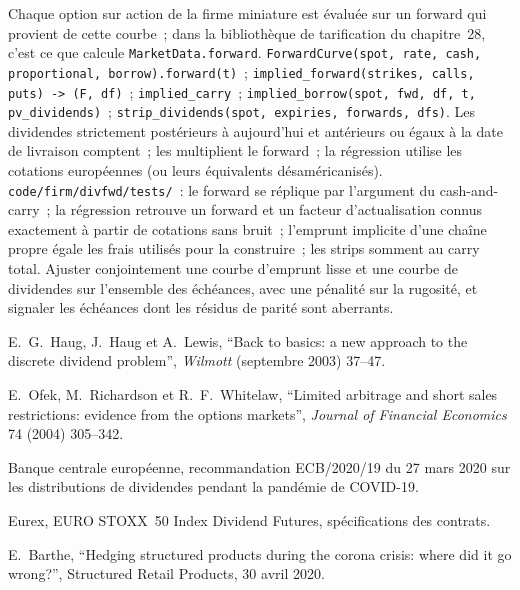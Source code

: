 \begin{build}
 Chaque option sur action de la firme miniature est évaluée sur un forward qui
provient de cette courbe~; dans la bibliothèque de tarification du chapitre~28, c'est ce que
calcule \texttt{MarketData.forward}. 
\texttt{ForwardCurve(spot, rate, cash, proportional,
borrow).forward(t)}~; \texttt{implied\_forward(strikes, calls, puts) -> (F, df)}~;
\texttt{implied\_carry}~; \texttt{implied\_borrow(spot, fwd, df, t, pv\_dividends)}~;
\texttt{strip\_dividends(spot, expiries, forwards, dfs)}.
 Les dividendes strictement postérieurs à aujourd'hui et antérieurs ou égaux à la date de livraison comptent~;
les  multiplient le forward~; la régression utilise les cotations européennes (ou
leurs équivalents désaméricanisés).
 \texttt{code/firm/divfwd/tests/}~: le forward se réplique par
l'argument du cash-and-carry~; la régression retrouve un forward et un facteur d'actualisation connus
exactement à partir de cotations sans bruit~; l'emprunt implicite d'une chaîne propre égale les frais utilisés
pour la construire~; les strips somment au carry total.
 Ajuster conjointement une courbe d'emprunt lisse et une courbe de dividendes sur l'ensemble des échéances,
avec une pénalité sur la rugosité, et signaler les échéances dont les résidus de parité sont aberrants.
\end{build}

\begin{omsources}
\item E.~G.~Haug, J.~Haug et A.~Lewis, ``Back to basics: a new approach to the
discrete dividend problem'', \emph{Wilmott} (septembre 2003) 37--47.
\item E.~Ofek, M.~Richardson et R.~F.~Whitelaw, ``Limited arbitrage and short sales
restrictions: evidence from the options markets'', \emph{Journal of Financial
Economics} 74 (2004) 305--342.
\item Banque centrale européenne, recommandation ECB/2020/19 du 27 mars 2020 sur les distributions
de dividendes pendant la pandémie de COVID-19.
\item Eurex, EURO STOXX~50 Index Dividend Futures, spécifications des contrats.
\item E.~Barthe, ``Hedging structured products during the corona crisis: where did it
go wrong?'', Structured Retail Products, 30 avril 2020.
\end{omsources}

